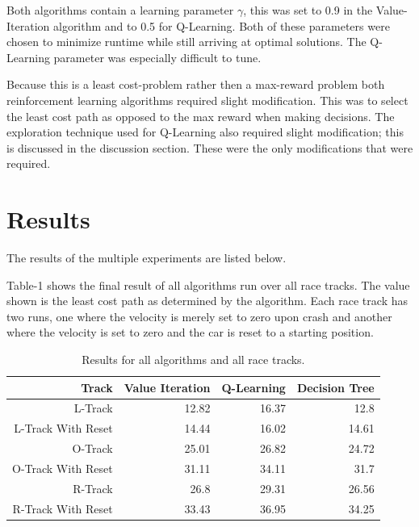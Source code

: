 \documentclass[12pt,letterpaper]{article}
\begin{document}
Both algorithms contain a learning parameter $\gamma$, this was set to 0.9 in the Value-Iteration algorithm and to 0.5 for Q-Learning. Both of these parameters were chosen to minimize runtime while still arriving at optimal solutions. The Q-Learning parameter was especially difficult to tune. 

Because this is a least cost-problem rather then a max-reward problem both reinforcement learning algorithms required slight modification. This was to select the least cost path as opposed to the max reward when making decisions. The exploration technique used for Q-Learning also required slight modification; this is discussed in the discussion section. These were the only modifications that were required. 

\section{Results}
The results of the multiple experiments are listed below. 


Table-1 shows the final result of all algorithms run over all race tracks. The value shown is the least cost path as determined by the algorithm. Each race track has two runs, one where the velocity is merely set to zero upon crash and another where the velocity is set to zero and the car is reset to a starting position. 

\begin{table}[h]
\begin{tabular}{|r|r|r|r|}
\hline
     Track & Value Iteration & Q-Learning & Decision Tree \\
\hline
   L-Track &      12.82 &      16.37 &       12.8 \\

L-Track With Reset &      14.44 &      16.02 &      14.61 \\

   O-Track &      25.01 &      26.82 &      24.72 \\

O-Track With Reset &      31.11 &      34.11 &       31.7 \\

   R-Track &       26.8 &      29.31 &      26.56 \\

R-Track With Reset &      33.43 &      36.95 &      34.25 \\
\hline
\end{tabular}  

\caption{Results for all algorithms and all race tracks. }
\end{table}
\end{document}
